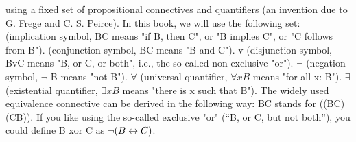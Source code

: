 using a fixed set of propositional connectives and quantifiers (an invention due to G. Frege and C. S.
Peirce). In this book, we will use the following set:
\IMPLIES  (implication symbol, B\IMPLIES C means "if B, then C", or "B implies C", or "C follows from B").
\AND  (conjunction symbol, B\AND C means "B and C").
v (disjunction symbol, BvC means "B, or C, or both", i.e., the so-called non-exclusive "or").
\(\neg\)  (negation symbol, \(\neg\) B means "not B").
\(\forall\)  (universal quantifier, \(\forall xB\) means "for all x: B").
\(\exists\)  (existential quantifier, \(\exists xB\) means "there is x such that B").
The widely used equivalence connective \IFF  can be derived in the following way: B\IFF C stands for
((B\IMPLIES C)\AND (C\IMPLIES B)). If you like using the so-called exclusive "or" (``B, or C, but not both''), you could
define B xor C as \(\neg (B\leftrightarrow C)\).

